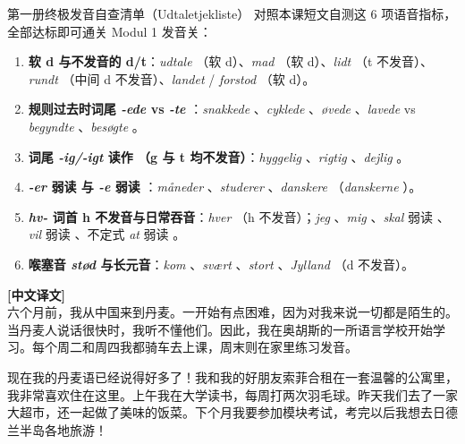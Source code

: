 \begin{tipbox}{第一册终极发音自查清单（Udtaletjekliste）}
对照本课短文自测这 6 项语音指标，全部达标即可通关 Modul 1 发音关：
\begin{enumerate}
  \item \textbf{软 d  与不发音的 d/t}：\textit{udtale} （软 d）、\textit{mad} （软 d）、\textit{lidt} （t 不发音）、\textit{rundt} （中间 d 不发音）、\textit{landet} / \textit{forstod} （软 d）。
  \item \textbf{规则过去时词尾 \textit{-ede}  vs \textit{-te} }：\textit{snakkede} 、\textit{cyklede} 、\textit{øvede} 、\textit{lavede}  vs \textit{begyndte} 、\textit{besøgte} 。
  \item \textbf{词尾 \textit{-ig/-igt} 读作 （g 与 t 均不发音）}：\textit{hyggelig} 、\textit{rigtig} 、\textit{dejlig} 。
  \item \textbf{\textit{-er} 弱读  与 \textit{-e} 弱读 }：\textit{måneder} 、\textit{studerer} 、\textit{danskere} （\textit{danskerne} ）。
  \item \textbf{\textit{hv-} 词首 h 不发音与日常吞音}：\textit{hver} （h 不发音）；\textit{jeg} 、\textit{mig} 、\textit{skal} 弱读 、\textit{vil} 弱读 、不定式 \textit{at} 弱读 。
  \item \textbf{喉塞音 \textit{stød}  与长元音}：\textit{kom} 、\textit{svært} 、\textit{stort} 、\textit{Jylland} （d 不发音）。
\end{enumerate}
\end{tipbox}

\begin{transbox}
\small
\textbf{\color{NCDTeal}[中文译文]}\\
六个月前，我从中国来到丹麦。一开始有点困难，因为对我来说一切都是陌生的。当丹麦人说话很快时，我听不懂他们。因此，我在奥胡斯的一所语言学校开始学习。每个周二和周四我都骑车去上课，周末则在家里练习发音。

现在我的丹麦语已经说得好多了！我和我的好朋友索菲合租在一套温馨的公寓里，我非常喜欢住在这里。上午我在大学读书，每周打两次羽毛球。昨天我们去了一家大超市，还一起做了美味的饭菜。下个月我要参加模块考试，考完以后我想去日德兰半岛各地旅游！
\end{transbox}

